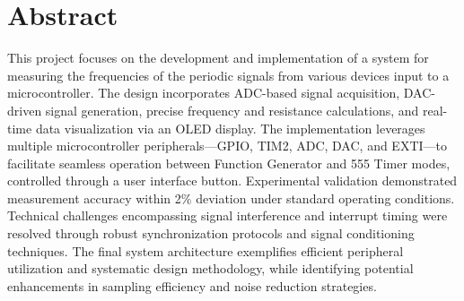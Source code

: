 \section*{Abstract}
This project focuses on the development and implementation of a system for measuring the frequencies of the periodic signals from various devices input to a microcontroller. The design incorporates ADC-based signal acquisition, DAC-driven signal generation, precise frequency and resistance calculations, and real-time data visualization via an OLED display. The implementation leverages multiple microcontroller peripherals—GPIO, TIM2, ADC, DAC, and EXTI—to facilitate seamless operation between Function Generator and 555 Timer modes, controlled through a user interface button. Experimental validation demonstrated measurement accuracy within 2\% deviation under standard operating conditions. Technical challenges encompassing signal interference and interrupt timing were resolved through robust synchronization protocols and signal conditioning techniques. The final system architecture exemplifies efficient peripheral utilization and systematic design methodology, while identifying potential enhancements in sampling efficiency and noise reduction strategies.

